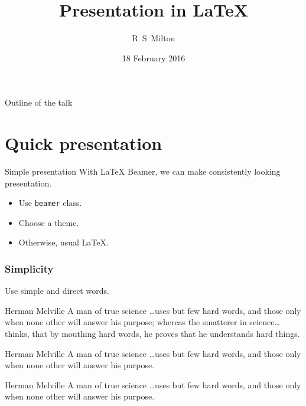 \documentclass[11pt]{beamer}
\title{Presentation in \LaTeX}
\author[Milton]{R~S~Milton}
\institute[]{
  Department of Computer Science\\
  SSN College of Engineering
}
\date[]{18 February 2016}
\begin{document}
\begin{frame}
  \titlepage
\end{frame}

\begin{frame}{Outline of the talk}
  \tableofcontents
\end{frame}


\section{Quick presentation}

\begin{frame}{Simple presentation}
  With LaTeX Beamer, we can make consistently looking
  presentation.
  \begin{itemize}
  \item Use \texttt{beamer} class.
  \item Choose a theme.
  \item Otherwise, usual \LaTeX.
  \end{itemize}
\end{frame}

\begin{frame}
  \frametitle{Simplicity}
  Use simple and direct words.
  \begin{block}{Herman Melville}
    A man of true science \ldots uses but few hard words, and
    those only when none other will answer his purpose; whereas
    the smatterer in science\ldots thinks, that by mouthing
    hard words, he proves that he understands hard things.
  \end{block}
  \begin{alertblock}{Herman Melville}
    A man of true science \ldots uses but few hard words, and
    those only when none other will answer his purpose.
  \end{alertblock}
  \begin{exampleblock}
    {Herman Melville}
    A man of true science \ldots uses but few hard words, and
    those only when none other will answer his purpose.
  \end{exampleblock}
\end{frame}
\end{document}
